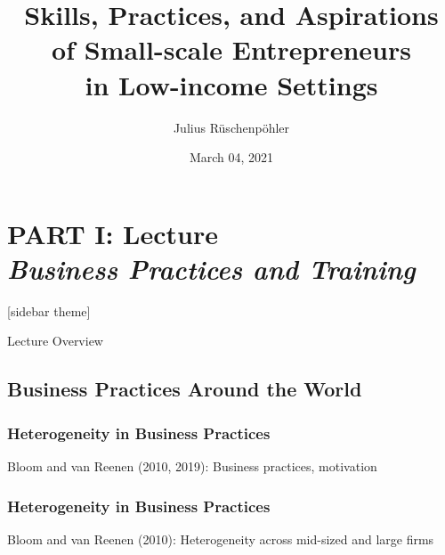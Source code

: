 \documentclass[hideothersubsections, usenames,dvipsnames,11pt]{beamer}
\title[]{Skills, Practices, and Aspirations \\ of Small-scale Entrepreneurs \\ in Low-income Settings}
\author[]{Julius R{\"u}schenp{\"o}hler\inst{}}
\institute[]{\inst{} UC Berkeley, CEGA}
\date{March 04, 2021}
\newenvironment{itemize_2pt}{\itemize\addtolength{\itemsep}{2pt}}{\enditemize}
\begin{document}
\section{\textbf{PART I: Lecture} \\ \quad \emph{Business Practices and Training}}



\begin{frame}
\titlepage
\end{frame}


[sidebar theme]

\begin{frame}{Lecture Overview}
\end{frame}


\subsection{Business Practices Around the World}

\begin{frame}
\frametitle{Heterogeneity in Business Practices}
	\begin{itemize_2pt}
	\item Bloom and van Reenen (2010, 2019): Business practices, motivation \citep{Bloom2010, Bloom2019}
	\vspace{0.1in}
	\end{itemize_2pt}
\end{frame}

\begin{frame}
\frametitle{Heterogeneity in Business Practices}
	\begin{itemize_2pt}
	\item Bloom and van Reenen (2010): Heterogeneity across mid-sized and large firms \citep{Bloom2010}
	\end{itemize_2pt}
\end{frame}


\end{document}
